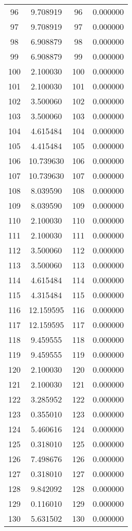 \documentclass[12pt]{article}
\begin{document}
\begin{longtable}{@{}cccc@{}}
96 & 9.708919 & 96 & 0.000000 \\
97 & 9.708919 & 97 & 0.000000 \\
98 & 6.908879 & 98 & 0.000000 \\
99 & 6.908879 & 99 & 0.000000 \\
100 & 2.100030 & 100 & 0.000000 \\
101 & 2.100030 & 101 & 0.000000 \\
102 & 3.500060 & 102 & 0.000000 \\
103 & 3.500060 & 103 & 0.000000 \\
104 & 4.615484 & 104 & 0.000000 \\
105 & 4.415484 & 105 & 0.000000 \\
106 & 10.739630 & 106 & 0.000000 \\
107 & 10.739630 & 107 & 0.000000 \\
108 & 8.039590 & 108 & 0.000000 \\
109 & 8.039590 & 109 & 0.000000 \\
110 & 2.100030 & 110 & 0.000000 \\
111 & 2.100030 & 111 & 0.000000 \\
112 & 3.500060 & 112 & 0.000000 \\
113 & 3.500060 & 113 & 0.000000 \\
114 & 4.615484 & 114 & 0.000000 \\
115 & 4.315484 & 115 & 0.000000 \\
116 & 12.159595 & 116 & 0.000000 \\
117 & 12.159595 & 117 & 0.000000 \\
118 & 9.459555 & 118 & 0.000000 \\
119 & 9.459555 & 119 & 0.000000 \\
120 & 2.100030 & 120 & 0.000000 \\
121 & 2.100030 & 121 & 0.000000 \\
122 & 3.285952 & 122 & 0.000000 \\
123 & 0.355010 & 123 & 0.000000 \\
124 & 5.460616 & 124 & 0.000000 \\
125 & 0.318010 & 125 & 0.000000 \\
126 & 7.498676 & 126 & 0.000000 \\
127 & 0.318010 & 127 & 0.000000 \\
128 & 9.842092 & 128 & 0.000000 \\
129 & 0.116010 & 129 & 0.000000 \\
130 & 5.631502 & 130 & 0.000000 \\

\end{longtable}
\end{document}
